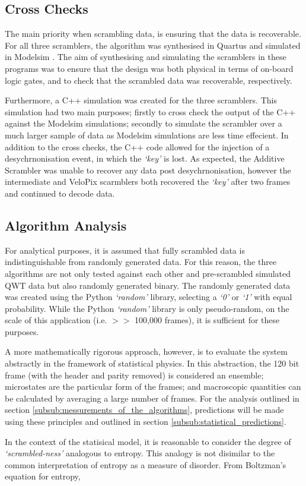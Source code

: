 	\subsection{Cross Checks} %
	\label{sub:cross_checks}
		The main priority when scrambling data, is ensuring that the data is recoverable.
		For all three scramblers, the algorithm was synthesised in Quartus \cite{ref:quartus} and simulated in Modelsim \cite{ref:modelsim}.
		The aim of synthesising and simulating the scramblers in these programs was to ensure that the design was both physical in terms of on-board logic gates, and to check that the scrambled data was recoverable, respectively.
		\par
		Furthermore, a C++ simulation was created for the three scramblers.
		This simulation had two main purposes;
		firstly to cross check the output of the C++ against the Modelsim simulations;
		secondly to simulate the scrambler over a much larger sample of data as Modelsim simulations are less time effecient.
		In addition to the cross checks, the C++ code allowed for the injection of a desychrnonisation event, in which the \textit{`key'} is lost.
		As expected, the Additive Scrambler was unable to recover any data post desychrnonisation, however the intermediate and VeloPix scarmblers both recovered the \textit{`key'} after two frames and continued to decode data.


	\subsection{Algorithm Analysis}
	\label{sub:algorithm_analysis}

		For analytical purposes, it is assumed that fully scrambled data is indistinguishable from randomly generated data. 
		For this reason, the three algorithms are not only tested against each other and pre-scrambled simulated QWT data but also randomly generated binary.
		The randomly generated data was created using the Python \textit{`random'} library, selecting a \textit{`0'} or \textit{`1'} with equal probability.
		While the Python \textit{`random'} library is only pseudo-random, on the scale of this application (i.e. $>>$ 100,000 frames), it is sufficient for these purposes.
		\par
		A more mathematically rigorous approach, however, is to evaluate the system abstractly in the framework of statistical physics.
		In this abstraction, the 120 bit frame (with the header and parity removed)  is considered an ensemble; 
		microstates are the particular form of the frames;
		and macroscopic quantities can be calculated by averaging a large number of frames.
		For the analysis outlined in section \ref{subsub:messurements_of_the_algorithms}, predictions will be made using these principles and outlined in section \ref{subsub:statistical_predictions}.
		\par
		In the context of the statisical model, it is reasonable to consider the degree of \textit{`scrambled-ness'} analogous to entropy.	
		This analogy is not disimilar to the common interpretation of entropy as a measure of disorder. 
		From Boltzman's equation for entropy,

